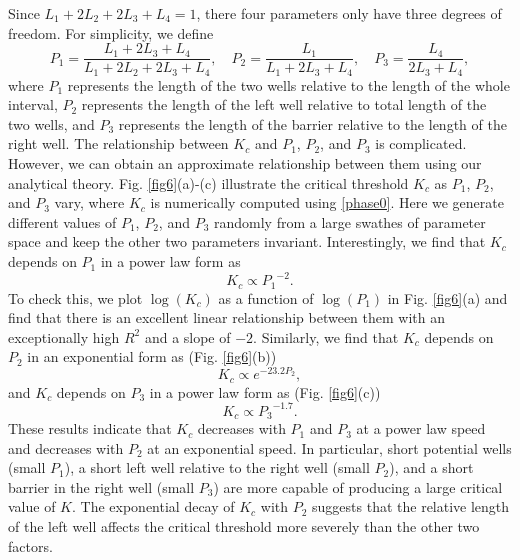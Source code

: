 \documentclass[a4paper,11pt]{article}
\begin{document}
Since $L_1 + 2 L_2 + 2 L_3 + L_4 = 1$, there four parameters only have three degrees of freedom. For simplicity, we define
\begin{equation}
P_1 = \frac{L_1 + 2 L_3 + L_4}{L_1 + 2 L_2 + 2 L_3 + L_4}, \quad P_2 = \frac{L_1}{L_1 + 2 L_3 + L_4}, \quad P_3 = \frac{L_4}{2 L_3 + L_4},
\end{equation}
where $P_1$ represents the length of the two wells relative to the length of the whole interval, $P_2$ represents the length of the left well relative to total length of the two wells, and $P_3$ represents the length of the barrier relative to the length of the right well. The relationship between $K_c$ and $P_1$, $P_2$, and $P_3$ is complicated. However, we can obtain an approximate relationship between them using our analytical theory. Fig. \ref{fig6}(a)-(c) illustrate the critical threshold $K_c$ as $P_1$, $P_2$, and $P_3$ vary, where $K_c$ is numerically computed using \eqref{phase0}. Here we generate different values of $P_1$, $P_2$, and $P_3$ randomly from a large swathes of parameter space and keep the other two parameters invariant. Interestingly, we find that $K_c$ depends on $P_1$ in a power law form as
\begin{equation}
K_c \propto {P_1}^{-2}.
\end{equation}
To check this, we plot $\log(K_c)$ as a function of $\log(P_1)$ in Fig. \ref{fig6}(a) and find that there is an excellent linear relationship between them with an exceptionally high $R^2$ and a slope of $-2$. Similarly, we find that $K_c$ depends on $P_2$ in an exponential form as (Fig. \ref{fig6}(b))
\begin{equation}
K_c \propto e^{-23.2P_2},
\end{equation}
and $K_c$ depends on $P_3$ in a power law form as (Fig. \ref{fig6}(c))
\begin{equation}
K_c \propto {P_3}^{-1.7}.
\end{equation}
These results indicate that $K_c$ decreases with $P_1$ and $P_3$ at a power law speed and decreases with $P_2$ at an exponential speed. In particular, short potential wells (small $P_1$), a short left well relative to the right well (small $P_2$), and a short barrier in the right well (small $P_3$) are more capable of producing a large critical value of $K$. The exponential decay of $K_c$ with $P_2$ suggests that the relative length of the left well affects the critical threshold more severely than the other two factors.
\end{document}
